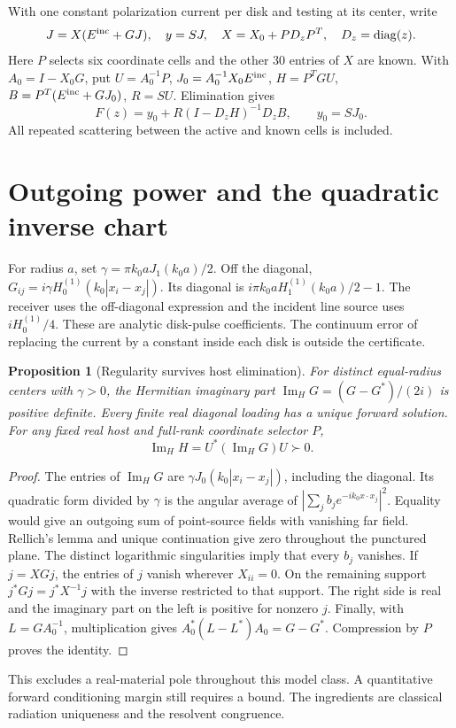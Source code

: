 \documentclass[10pt]{article}
\newtheorem{proposition}{Proposition}
\newcommand{\imH}{\operatorname{Im}_{\!H}}
\newcommand{\diag}{\operatorname{diag}}
\begin{document}
With one constant polarization current per disk and testing at its center, write
\[
 J=X(E^{\rm inc}+GJ),\quad y=SJ,\quad X=X_0+P D_zP^T,\quad D_z=\diag(z).
\]
Here $P$ selects six coordinate cells and the other 30 entries of $X$ are known. With $A_0=I-X_0G$, put $U=A_0^{-1}P$, $J_0=A_0^{-1}X_0 E^{\rm inc}$, $H=P^TGU$, $B=P^T(E^{\rm inc}+GJ_0)$, $R=SU$. Elimination gives
\begin{equation}
 F(z)=y_0+R(I-D_zH)^{-1}D_z B,\qquad y_0=SJ_0. \label{forward}
\end{equation}
All repeated scattering between the active and known cells is included.

\section{Outgoing power and the quadratic inverse chart}
For radius $a$, set $\gamma=\pi k_0 a J_1(k_0a)/2$. Off the diagonal, $G_{ij}=i\gamma H_0^{(1)}(k_0|x_i-x_j|)$. Its diagonal is $i\pi k_0a H_1^{(1)}(k_0a)/2-1$. The receiver uses the off-diagonal expression and the incident line source uses $iH_0^{(1)}/4$. These are analytic disk-pulse coefficients. The continuum error of replacing the current by a constant inside each disk is outside the certificate.

\begin{proposition}[Regularity survives host elimination]\label{power}
For distinct equal-radius centers with $\gamma>0$, the Hermitian imaginary part $\imH G=(G-G^*)/(2i)$ is positive definite. Every finite real diagonal loading has a unique forward solution. For any fixed real host and full-rank coordinate selector $P$,
\[
                     \imH H=U^*(\imH G)U\succ0.
\]
\end{proposition}
\begin{proof}
The entries of $\imH G$ are $\gamma J_0(k_0|x_i-x_j|)$, including the diagonal. Its quadratic form divided by $\gamma$ is the angular average of $|\sum_j b_j e^{-ik_0\hat x\cdot x_j}|^2$. Equality would give an outgoing sum of point-source fields with vanishing far field. Rellich's lemma and unique continuation give zero throughout the punctured plane. The distinct logarithmic singularities imply that every $b_j$ vanishes. If $j=XGj$, the entries of $j$ vanish wherever $X_{ii}=0$. On the remaining support $j^*Gj=j^*X^{-1}j$ with the inverse restricted to that support. The right side is real and the imaginary part on the left is positive for nonzero $j$. Finally, with $L=GA_0^{-1}$, multiplication gives $A_0^*(L-L^*)A_0=G-G^*$. Compression by $P$ proves the identity.
\end{proof}
This excludes a real-material pole throughout this model class. A quantitative forward conditioning margin still requires a bound. The ingredients are classical radiation uniqueness and the resolvent congruence.
\end{document}
